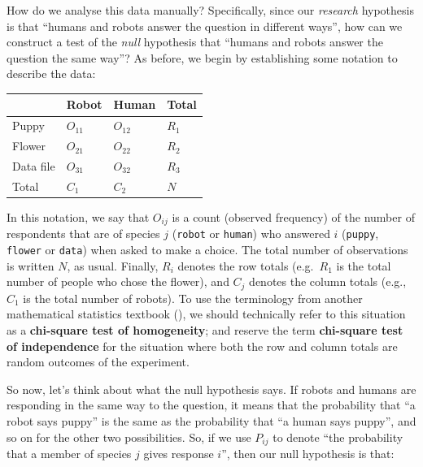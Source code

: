 \documentclass[
  11pt,
  a4paper,
  twoside,symmetric,openright]{book}
\theoremstyle{break}
\theoremstyle{break}
\begin{document}
How do we analyse this data manually? Specifically, since our \emph{research} hypothesis is that ``humans and robots answer the question in different ways'', how can we construct a test of the \emph{null} hypothesis that ``humans and robots answer the question the same way''? As before, we begin by establishing some notation to describe the data:

\begin{longtable}[]{@{}llll@{}}
\toprule\noalign{}
& Robot & Human & Total \\
\midrule\noalign{}
\endhead
\bottomrule\noalign{}
\endlastfoot
Puppy & \(O_{11}\) & \(O_{12}\) & \(R_{1}\) \\
Flower & \(O_{21}\) & \(O_{22}\) & \(R_{2}\) \\
Data file & \(O_{31}\) & \(O_{32}\) & \(R_{3}\) \\
Total & \(C_{1}\) & \(C_{2}\) & \(N\) \\
\end{longtable}

In this notation, we say that \(O_{ij}\) is a count (observed frequency) of the number of respondents that are of species \(j\) (\texttt{robot} or \texttt{human}) who answered \(i\) (\texttt{puppy}, \texttt{flower} or \texttt{data}) when asked to make a choice. The total number of observations is written \(N\), as usual. Finally, \(R_i\) denotes the row totals (e.g.~\(R_1\) is the total number of people who chose the flower), and \(C_j\) denotes the column totals (e.g., \(C_1\) is the total number of robots). To use the terminology from another mathematical statistics textbook (), we should technically refer to this situation as a \textbf{chi-square test of homogeneity}; and reserve the term \textbf{chi-square test of independence} for the situation where both the row and column totals are random outcomes of the experiment.

So now, let's think about what the null hypothesis says. If robots and humans are responding in the same way to the question, it means that the probability that ``a robot says puppy'' is the same as the probability that ``a human says puppy'', and so on for the other two possibilities. So, if we use \(P_{ij}\) to denote ``the probability that a member of species \(j\) gives response \(i\)'', then our null hypothesis is that:
\end{document}
